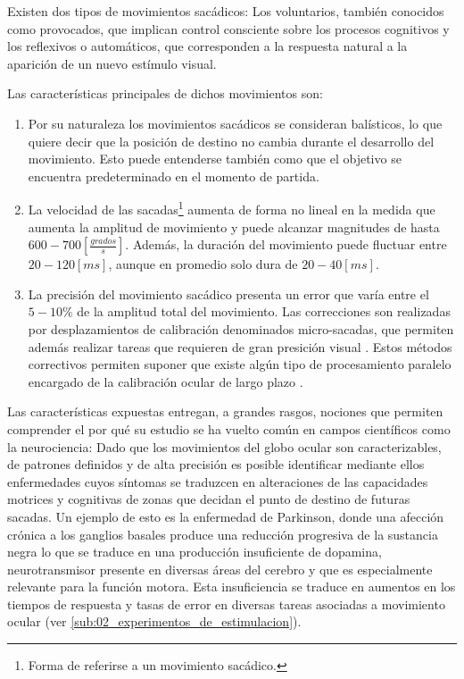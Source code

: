 \documentclass[../Main.tex]{subfiles}
\begin{document}
		Existen dos tipos de movimientos sacádicos: Los voluntarios, también conocidos como provocados, que implican control consciente sobre los procesos cognitivos y los reflexivos o automáticos, que corresponden a la respuesta natural a la aparición de un nuevo estímulo visual.

		Las características principales de dichos movimientos son:
		\begin{enumerate}\setlength\itemsep{-0.5em}
			\item Por su naturaleza los movimientos sacádicos se consideran balísticos, lo que quiere decir que la posición de destino no cambia durante el desarrollo del movimiento. Esto puede entenderse también como que el objetivo se encuentra predeterminado en el momento de partida.

			\item La velocidad de las sacadas\footnote{Forma de referirse a un movimiento sacádico.} aumenta de forma no lineal en la medida que aumenta la amplitud de movimiento y puede alcanzar magnitudes de hasta $600 - 700[\frac{grados}{s}]$. Además, la duración del movimiento puede fluctuar entre $20 - 120[ms]$, aunque en promedio solo dura de $20-40[ms]$. 

			\item La precisión del movimiento sacádico presenta un error que varía entre el $5-10\%$ de la amplitud total del movimiento. Las correcciones son realizadas por desplazamientos de calibración denominados micro-sacadas, que permiten además realizar tareas que requieren de gran presición visual \cite{article:movOcular4}. Estos métodos correctivos permiten suponer que existe algún tipo de procesamiento paralelo encargado de la calibración ocular de largo plazo \cite{article:movOcular2}.  

		\end{enumerate}

		Las características expuestas entregan, a grandes rasgos, nociones que permiten comprender el por qué su estudio se ha vuelto común en campos científicos como la neurociencia: Dado que los movimientos del globo ocular son caracterizables, de patrones definidos y de alta precisión es posible identificar mediante ellos enfermedades cuyos síntomas se traduzcen en alteraciones de las capacidades motrices y cognitivas de zonas que decidan el punto de destino de futuras sacadas. Un ejemplo de esto es la enfermedad de Parkinson, donde una afección crónica a los ganglios basales produce una reducción progresiva de la sustancia negra lo que se traduce en una producción insuficiente de dopamina, neurotransmisor presente en diversas áreas del cerebro y que es especialmente relevante para la función motora. Esta insuficiencia se traduce en aumentos en los tiempos de respuesta y tasas de error en diversas tareas asociadas a movimiento ocular \cite{article:tests_1, article:tests_2, article:tests_3, article:tests_4} (ver \ref{sub:02_experimentos_de_estimulacion}).    
\end{document}
